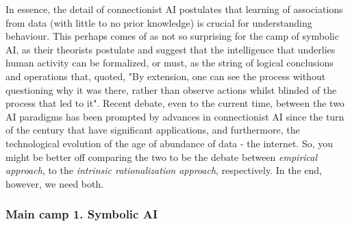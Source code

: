 In essence, the detail of connectionist AI postulates that learning of associations from data (with little to no prior knowledge) is crucial for understanding behaviour. This perhaps comes of as not so surprising for the camp of symbolic AI, as their theorists postulate and suggest that the intelligence that underlies human activity can be formalized, or must, as the string of logical conclusions and operations that, quoted, "By extension, one can see the process without questioning why it was there, rather than observe actions whilst blinded of the process that led to it". Recent debate, even to the current time, between the two AI paradigms has been prompted by advances in connectionist AI since the turn of the century that have significant applications, and furthermore, the technological evolution of the age of abundance of data - the internet. So, you might be better off comparing the two to be the debate between \textit{empirical approach}, to the \textit{intrinsic rationalization approach}, respectively. In the end, however, we need both. \cite{Goel_2022}

\subsubsection{Main camp 1. Symbolic AI}

